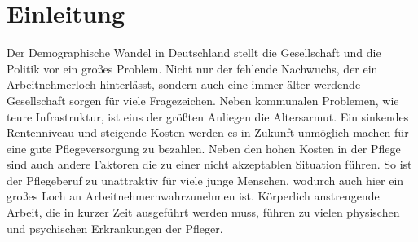 \section{Einleitung}
\label{sec:einleitung}

Der Demographische Wandel in Deutschland stellt die Gesellschaft und die Politik vor ein großes Problem. Nicht nur der fehlende Nachwuchs, der ein Arbeitnehmerloch hinterlässt, sondern auch eine immer älter werdende Gesellschaft sorgen für viele Fragezeichen. Neben kommunalen Problemen, wie teure Infrastruktur, ist eins der größten Anliegen die Altersarmut. Ein sinkendes Rentenniveau und steigende Kosten werden es in Zukunft unmöglich machen für eine gute Pflegeversorgung zu bezahlen. \citep{brunozandonella2013} Neben den hohen Kosten in der Pflege sind auch andere Faktoren die zu einer nicht akzeptablen Situation führen. So ist der Pflegeberuf zu unattraktiv für viele junge Menschen, wodurch auch hier ein großes Loch an Arbeitnehmern\FemaleMale wahrzunehmen ist. Körperlich anstrengende Arbeit, die in kurzer Zeit ausgeführt werden muss, führen zu vielen physischen und psychischen Erkrankungen der Pfleger\FemaleMale .\citep{AOK2004}

